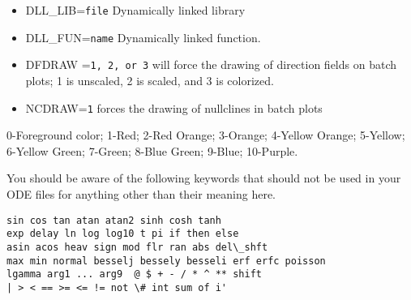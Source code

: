 \begin{itemize}
{NORMMAX, AUTOXMIN, AUTOXMAX, AUTOYMIN, AUTOYMAX, AUTOVAR}.  The last
is the variable to plot on the y-axis. The x-axis variable is always
the first parameter in the ODE file unless you change it within AUTO. 
\item DLL\_LIB={\tt file} Dynamically linked library
\item  DLL\_FUN={\tt name} Dynamically linked function.
\item DFDRAW ={\tt 1, 2, or 3} will force the drawing of direction fields on batch plots; 1 is unscaled, 2 is scaled, and 3 is colorized.
\item NCDRAW={\tt 1} forces the drawing of nullclines in batch plots
\end{itemize}

\bigskip 
{} 0-Foreground color; 1-Red; 2-Red Orange; 3-Orange;
4-Yellow Orange; 5-Yellow; 6-Yellow Green; 7-Green; 8-Blue Green; 9-Blue;
10-Purple.

\bigskip
{}
You should be aware of the following
keywords that should not be used in your ODE files for anything other
than their meaning here.
\begin{verbatim}
sin cos tan atan atan2 sinh cosh tanh
exp delay ln log log10 t pi if then else
asin acos heav sign mod flr ran abs del\_shft 
max min normal besselj bessely besseli erf erfc poisson
lgamma arg1 ... arg9  @ $ + - / * ^ ** shift
| > < == >= <= != not \# int sum of i'
\end{verbatim}




